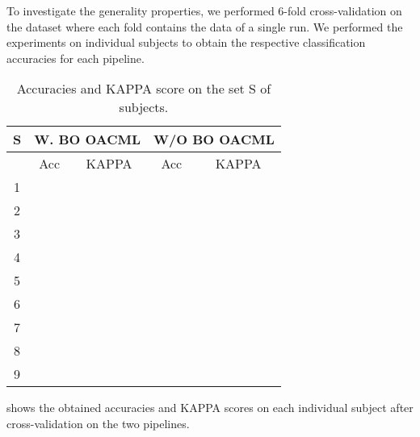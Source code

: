 To investigate the generality properties, we performed 6-fold cross-validation on the dataset where each fold contains the data of a single run. We performed the experiments on individual subjects to obtain the respective classification accuracies for each pipeline.
\begin{table}[H]
	\centering
	\caption{Accuracies and KAPPA score on the set S of subjects.}
	\label{fig:results}
	\begin{tabular}{@{}ccc|cc@{}}
		\toprule
		\textbf{S}             & \multicolumn{2}{c|}{\textbf{W. BO OACML}} & \multicolumn{2}{c}{\textbf{W/O BO OACML}} \\ \midrule
		\multicolumn{1}{c|}{}  & Acc                   & KAPPA             & Acc                   & KAPPA             \\ \midrule
		\multicolumn{1}{c|}{1} &                       &                   &                       &                   \\
		\multicolumn{1}{c|}{2} &                       &                   &                       &                   \\
		\multicolumn{1}{c|}{3} &                       &                   &                       &                   \\
		\multicolumn{1}{c|}{4} &                       &                   &                       &                   \\
		\multicolumn{1}{c|}{5} & \textbf{}             &                   & \textbf{}             &                   \\
		\multicolumn{1}{c|}{6} &                       &                   &                       &                   \\
		\multicolumn{1}{c|}{7} &                       &                   &                       &                   \\
		\multicolumn{1}{c|}{8} &                       &                   &                       &                   \\
		\multicolumn{1}{c|}{9} &                       &                   &                       &                   \\ \bottomrule
	\end{tabular}
\end{table}
 shows the obtained accuracies and KAPPA scores on each individual subject after cross-validation on the two pipelines.

